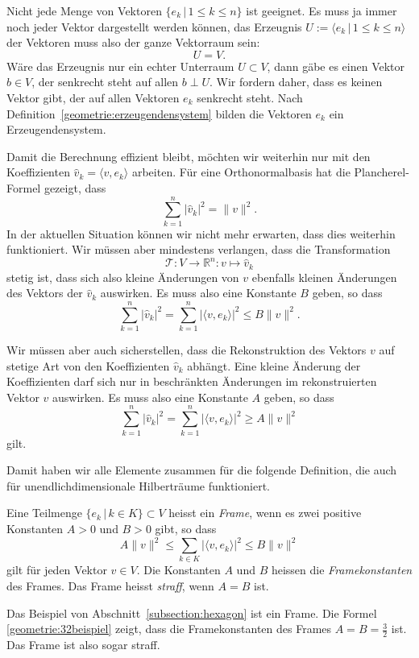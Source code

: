 Nicht jede Menge von Vektoren $\{e_k\,|\,1\le k\le n\}$ ist geeignet.
Es muss ja immer noch jeder Vektor dargestellt werden können, das
Erzeugnis $U := \langle e_k\,|\,1\le k\le n\rangle$
der Vektoren muss also der ganze Vektorraum sein:
\[
U
=
V.
\]
Wäre das Erzeugnis nur ein echter Unterraum $U\subset V$, dann gäbe es
einen Vektor $b\in V$, der senkrecht steht auf allen $b\perp U$.
Wir fordern daher, dass es keinen Vektor gibt, der auf allen Vektoren $e_k$
senkrecht steht.
Nach Definition~\ref{geometrie:erzeugendensystem} bilden die
Vektoren $e_k$ ein Erzeugendensystem.

Damit die Berechnung effizient bleibt, möchten wir weiterhin nur mit den
Koeffizienten $\hat{v}_k = \langle v,e_k\rangle$ arbeiten.
Für eine Orthonormalbasis hat die Plancherel-Formel gezeigt, dass
\[
\sum_{k=1}^n |\hat{v}_k|^2 = \|v\|^2.
\]
In der aktuellen Situation können wir nicht mehr erwarten, dass dies 
weiterhin funktioniert.
Wir müssen aber mindestens verlangen, dass die Transformation
\[
\mathcal{T}
\colon
V\to \mathbb R^n
:
v\mapsto \hat{v}_k
\]
stetig ist, dass sich also kleine Änderungen von $v$ ebenfalls
kleinen Änderungen des Vektors der $\hat{v}_k$ auswirken.
Es muss also eine Konstante $B$ geben, so dass
\[
\sum_{k=1}^n |\hat{v}_k|^2
=
\sum_{k=1}^n |\langle v,e_k\rangle|^2
\le
B \|v\|^2.
\]

Wir müssen aber auch sicherstellen, dass die Rekonstruktion des Vektors $v$
auf stetige Art von den Koeffizienten $\hat{v}_k$ abhängt. 
Eine kleine Änderung der Koeffizienten darf sich nur in beschränkten Änderungen
im rekonstruierten Vektor $v$ auswirken.
Es muss also eine Konstante $A$ geben, so dass
\[
\sum_{k=1}^n |\hat{v}_k|^2
=
\sum_{k=1}^n |\langle v,e_k\rangle|^2
\ge
A \| v \|^2
\]
gilt.

Damit haben wir alle Elemente zusammen für die folgende Definition,
die auch für unendlichdimensionale Hilberträume funktioniert.

\begin{definition}
\label{definition:frame}
Eine Teilmenge $\{ e_k\,|\, k\in K\}\subset V$ heisst ein {\em Frame},
%
wenn es zwei positive Konstanten $A>0$ und $B>0$ gibt, so dass
\[
A\|v\|^2 \le \sum_{k\in K} |\langle v, e_k\rangle|^2 \le B \| v\|^2
\]
gilt für jeden Vektor $v\in V$.
Die Konstanten $A$ und $B$ heissen die {\em Framekonstanten} des Frames.
%
Das Frame heisst {\em straff}, wenn $A=B$ ist.
%
\end{definition}

\begin{beispiel}
Das Beispiel von Abschnitt~\ref{subsection:hexagon} ist ein Frame.
Die Formel \eqref{geometrie:32beispiel} zeigt, dass die Framekonstanten
des Frames $A=B=\frac32$ ist.
Das Frame ist also sogar straff.
\end{beispiel}

